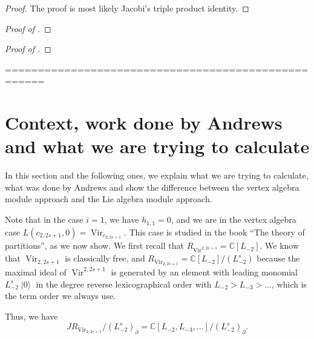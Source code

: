 \documentclass[a4paper, 12pt, reqno]{amsart}
\theoremstyle{remark}
\DeclareMathOperator{\Vir}{Vir}
\DeclareMathOperator{\vac}{|0\rangle}
\begin{document}
\begin{proof}
  The proof is most likely Jacobi's triple product identity.
\end{proof}

\begin{proof}[Proof of ]
  
\end{proof}

\begin{proof}[Proof of ]
  
\end{proof}

====================================================

\section{Context, work done by Andrews and what we are trying to calculate}
\label{sec:context-work-done}

In this section and the following ones, we explain what we are trying to calculate, what was done by Andrews and show the difference between the vertex algebra module approach and the Lie algebra module approach.

Note that in the case $i = 1$, we have $h_{1, 1} = 0$, and we are in the vertex algebra case $L(c_{2, 2s + 1}, 0) = \Vir_{c_{2, 2s + 1}}$.
This case is studied in the book ``The theory of partitions'', as we now show.
We first recall that $R_{\Vir^{2, 2s + 1}} = \mathbb{C}[L_{-2}]$.
We know that $\Vir_{2, 2s + 1}$ is classically free, and $R_{\Vir_{2, 2s + 1}} = \mathbb{C}[L_{-2}]/(L_{-2}^s)$ because the maximal ideal of $\Vir^{2, 2s + 1}$ is generated by an element with leading monomial $L_{-2}^s\vac$ in the degree reverse lexicographical order with $L_{-2} > L_{-3} > \dots$, which is the term order we always use.

Thus, we have 
\begin{equation*}
  JR_{\Vir_{2, 2s + 1}}/(L_{-2}^s)_{\partial} = \mathbb{C}[L_{-2}, L_{-3}, \dots]/(L_{-2}^s)_{\partial}.
\end{equation*}
\end{document}
